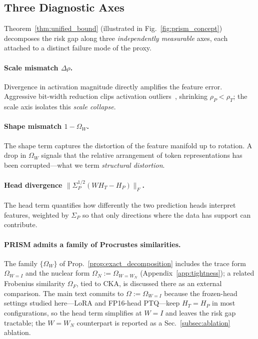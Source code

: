 \documentclass{article}
\begin{document}
\subsection{Three Diagnostic Axes}
\label{subsec:interpretation}

Theorem~\ref{thm:unified_bound} (illustrated in Fig.~\ref{fig:prism_concept}) decomposes the risk gap along three \emph{independently measurable} axes, each attached to a distinct failure mode of the proxy.

\paragraph{Scale mismatch $\Delta\rho$.}
Divergence in activation magnitude directly amplifies the feature error. Aggressive bit-width reduction clips activation outliers~\cite{dettmers2022gpt3, xiao2023smoothquant}, shrinking $\rho_P < \rho_T$; the scale axis isolates this \emph{scale collapse}.

\paragraph{Shape mismatch $1-\Omega_W$.}
The shape term captures the distortion of the feature manifold up to rotation. A drop in $\Omega_W$ signals that the relative arrangement of token representations has been corrupted---what we term \emph{structural distortion}.

\paragraph{Head divergence $\|\Sigma_P^{1/2}(W H_T - H_P)\|_F$.}
The head term quantifies how differently the two prediction heads interpret features, weighted by $\Sigma_P$ so that only directions where the data has support can contribute.

\paragraph{PRISM admits a family of Procrustes similarities.}
The family $\{\Omega_W\}$ of Prop.~\ref{prop:exact_decomposition} includes the trace form $\Omega_{W=I}$ and the nuclear form $\Omega_N := \Omega_{W=W_N}$ (Appendix~\ref{app:tightness}); a related Frobenius similarity $\Omega_F$, tied to CKA, is discussed there as an external comparison. The main text commits to $\Omega := \Omega_{W=I}$ because the frozen-head settings studied here---LoRA and FP16-head PTQ---keep $H_T = H_P$ in most configurations, so the head term simplifies at $W = I$ and leaves the risk gap tractable; the $W = W_N$ counterpart is reported as a Sec.~\ref{subsec:ablation} ablation.
\end{document}
